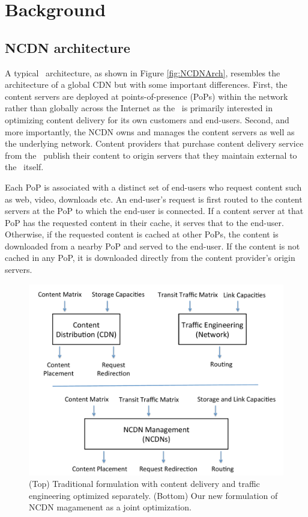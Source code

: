 

\section{Background}
\label{sec:ncdn-background}


\subsection{NCDN architecture} 

A typical \ncp\ architecture, as shown in Figure \ref{fig:NCDNArch}, resembles the architecture of a global CDN but with some important differences. First,  the content servers are deployed at points-of-presence (PoPs) within the network rather than globally across the Internet as the \ncp\ is primarily interested in optimizing content delivery for its own customers and end-users. Second, and more importantly, the NCDN owns and manages the content servers as well as the underlying network. Content providers that purchase content delivery service from the \ncp\ publish their content to origin servers that they maintain external to the \ncp\ itself. 


Each PoP is associated with a distinct set of end-users who request content such as web, video, downloads etc.  An end-user's request is first routed to the content servers at the PoP to which the end-user is connected.  If a content server at that PoP has the requested content in their cache, it serves that to the end-user. Otherwise, if the requested content is cached at other PoPs, the content is downloaded from a nearby PoP and served to the end-user. If the content is not cached in any PoP, it is downloaded directly from  the content provider's origin servers.


\begin{figure}[t]
\centerline{\includegraphics[scale=0.31]{ncdnpaper/NCDN}}
\caption{(Top) Traditional formulation with content delivery and traffic engineering optimized separately. (Bottom) Our new formulation of NCDN magamenent as a joint optimization.}
\vspace{-0.2in}
\label{fig:ncdntraditional}
\end{figure}



